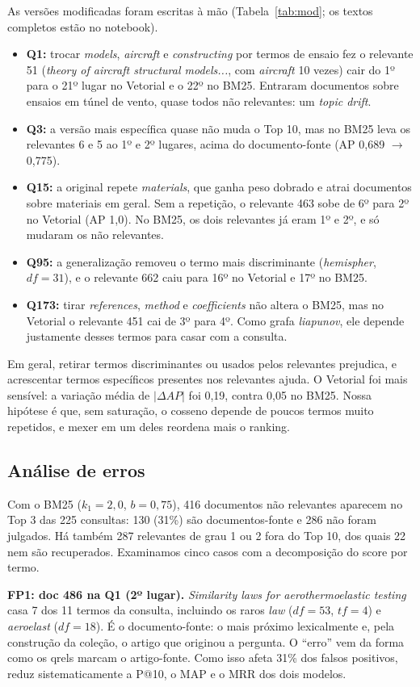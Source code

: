 \documentclass[10pt,a4paper]{article}
\newcommand{\term}[1]{\textit{#1}}      %
\begin{document}
As versões modificadas foram escritas à mão (Tabela~\ref{tab:mod}; os textos completos estão no notebook).
\begin{itemize}
  \item \textbf{Q1:} trocar \term{models}, \term{aircraft} e \term{constructing} por termos de ensaio fez o relevante 51 (\term{theory of aircraft structural models...}, com \term{aircraft} 10 vezes) cair do 1º para o 21º lugar no Vetorial e o 22º no BM25. Entraram documentos sobre ensaios em túnel de vento, quase todos não relevantes: um \term{topic drift}.
  \item \textbf{Q3:} a versão mais específica quase não muda o Top 10, mas no BM25 leva os relevantes 6 e 5 ao 1º e 2º lugares, acima do documento-fonte (AP 0,689 $\to$ 0,775).
  \item \textbf{Q15:} a original repete \term{materials}, que ganha peso dobrado e atrai documentos sobre materiais em geral. Sem a repetição, o relevante 463 sobe de 6º para 2º no Vetorial (AP 1,0). No BM25, os dois relevantes já eram 1º e 2º, e só mudaram os não relevantes.
  \item \textbf{Q95:} a generalização removeu o termo mais discriminante (\term{hemispher}, $df=31$), e o relevante 662 caiu para 16º no Vetorial e 17º no BM25.
  \item \textbf{Q173:} tirar \term{references}, \term{method} e \term{coefficients} não altera o BM25, mas no Vetorial o relevante 451 cai de 3º para 4º. Como grafa \term{liapunov}, ele depende justamente desses termos para casar com a consulta.
\end{itemize}
Em geral, retirar termos discriminantes ou usados pelos relevantes prejudica, e acrescentar termos específicos presentes nos relevantes ajuda. O Vetorial foi mais sensível: a variação média de $|\Delta AP|$ foi 0,19, contra 0,05 no BM25. Nossa hipótese é que, sem saturação, o cosseno depende de poucos termos muito repetidos, e mexer em um deles reordena mais o ranking.

\subsection{Análise de erros}
Com o BM25 ($k_1=2{,}0$, $b=0{,}75$), 416 documentos não relevantes aparecem no Top 3 das 225 consultas: 130 (31\%) são documentos-fonte e 286 não foram julgados. Há também 287 relevantes de grau 1 ou 2 fora do Top 10, dos quais 22 nem são recuperados. Examinamos cinco casos com a decomposição do score por termo.

\textbf{FP1: doc 486 na Q1 (2º lugar).} \term{Similarity laws for aerothermoelastic testing} casa 7 dos 11 termos da consulta, incluindo os raros \term{law} ($df=53$, $tf=4$) e \term{aeroelast} ($df=18$). É o documento-fonte: o mais próximo lexicalmente e, pela construção da coleção, o artigo que originou a pergunta. O ``erro'' vem da forma como os qrels marcam o artigo-fonte. Como isso afeta 31\% dos falsos positivos, reduz sistematicamente a P@10, o MAP e o MRR dos dois modelos.
\end{document}
